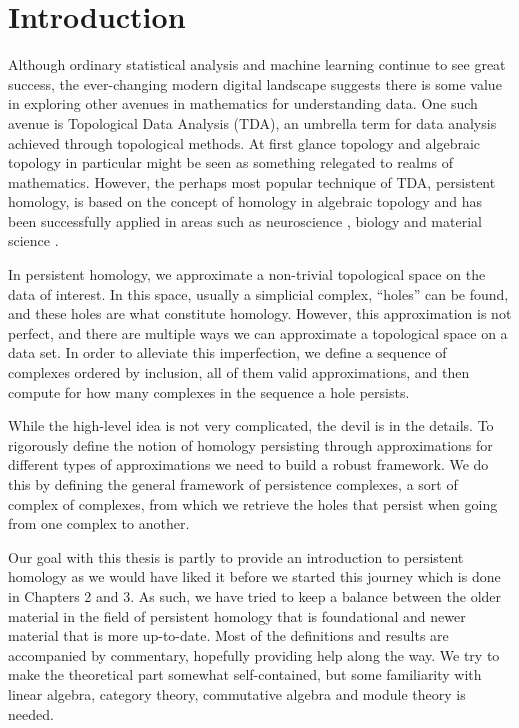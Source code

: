 \chapter{Introduction}
Although ordinary statistical analysis and machine learning continue to see great success, the ever-changing modern digital landscape suggests there is some value in exploring other avenues in mathematics for understanding data. One such avenue is Topological Data Analysis (TDA), an umbrella term for data analysis achieved through topological methods. At first glance topology and algebraic topology in particular might be seen as something relegated to realms of mathematics. However, the perhaps most popular technique of TDA, persistent homology, is based on the concept of homology in algebraic topology and has been successfully applied in areas such as neuroscience \cite{reimann}, biology \cite{plants} and material science \cite{moon2019}.

In persistent homology, we approximate a non-trivial topological space on the data of interest. In this space, usually a simplicial complex, ``holes'' can be found, and these holes are what constitute homology. However, this approximation is not perfect, and there are multiple ways we can approximate a topological space on a data set. In order to alleviate this imperfection, we define a sequence of complexes ordered by inclusion, all of them valid approximations, and then compute for how many complexes in the sequence a hole persists.

While the high-level idea is not very complicated, the devil is in the details. To rigorously define the notion of homology persisting through approximations for different types of approximations we need to build a robust framework. We do this by defining the general framework of persistence complexes, a sort of complex of complexes, from which we retrieve the holes that persist when going from one complex to another.


Our goal with this thesis is partly to provide an introduction to persistent homology as we would have liked it before we started this journey which is done in Chapters 2 and 3. As such, we have tried to keep a balance between the older material in the field of persistent homology that is foundational and newer material that is more up-to-date. Most of the definitions and results are accompanied by commentary, hopefully providing help along the way. We try to make the theoretical part somewhat self-contained, but some familiarity with linear algebra, category theory, commutative algebra and module theory is needed.

